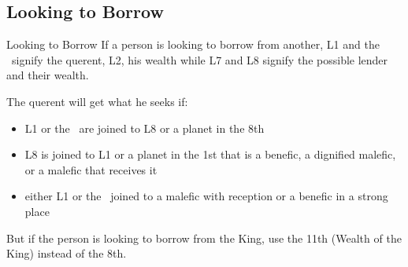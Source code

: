\subsection{Looking to Borrow}
\begin{frame}[t]{Looking to Borrow}
If a person is looking to borrow from another, L1 and the \Moon\ signify the querent, L2, his wealth while L7 and L8 signify the possible lender and their wealth.

The querent will get what he seeks if:
\begin{itemize}
\item L1 or the \Moon\ are joined to L8 or a planet in the 8th
\item L8 is joined to L1 or a planet in the 1st that is a benefic, a dignified malefic, or a malefic that receives it
\item either L1 or the \Moon\ joined to a malefic with reception or a benefic in a strong place
\end{itemize}

But if the person is looking to borrow from the King, use the 11th (Wealth of the King) instead of the 8th.

\end{frame}